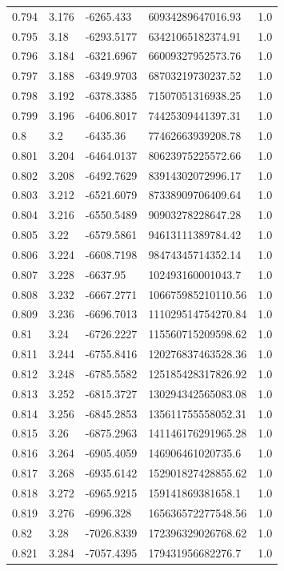 \begin{tabular}{lllll}
0.794 & 3.176 & -6265.433 & 60934289647016.93 & 1.0 \\
0.795 & 3.18 & -6293.5177 & 63421065182374.91 & 1.0 \\
0.796 & 3.184 & -6321.6967 & 66009327952573.76 & 1.0 \\
0.797 & 3.188 & -6349.9703 & 68703219730237.52 & 1.0 \\
0.798 & 3.192 & -6378.3385 & 71507051316938.25 & 1.0 \\
0.799 & 3.196 & -6406.8017 & 74425309441397.31 & 1.0 \\
0.8 & 3.2 & -6435.36 & 77462663939208.78 & 1.0 \\
0.801 & 3.204 & -6464.0137 & 80623975225572.66 & 1.0 \\
0.802 & 3.208 & -6492.7629 & 83914302072996.17 & 1.0 \\
0.803 & 3.212 & -6521.6079 & 87338909706409.64 & 1.0 \\
0.804 & 3.216 & -6550.5489 & 90903278228647.28 & 1.0 \\
0.805 & 3.22 & -6579.5861 & 94613111389784.42 & 1.0 \\
0.806 & 3.224 & -6608.7198 & 98474345714352.14 & 1.0 \\
0.807 & 3.228 & -6637.95 & 102493160001043.7 & 1.0 \\
0.808 & 3.232 & -6667.2771 & 106675985210110.56 & 1.0 \\
0.809 & 3.236 & -6696.7013 & 111029514754270.84 & 1.0 \\
0.81 & 3.24 & -6726.2227 & 115560715209598.62 & 1.0 \\
0.811 & 3.244 & -6755.8416 & 120276837463528.36 & 1.0 \\
0.812 & 3.248 & -6785.5582 & 125185428317826.92 & 1.0 \\
0.813 & 3.252 & -6815.3727 & 130294342565083.08 & 1.0 \\
0.814 & 3.256 & -6845.2853 & 135611755558052.31 & 1.0 \\
0.815 & 3.26 & -6875.2963 & 141146176291965.28 & 1.0 \\
0.816 & 3.264 & -6905.4059 & 146906461020735.6 & 1.0 \\
0.817 & 3.268 & -6935.6142 & 152901827428855.62 & 1.0 \\
0.818 & 3.272 & -6965.9215 & 159141869381658.1 & 1.0 \\
0.819 & 3.276 & -6996.328 & 165636572277548.56 & 1.0 \\
0.82 & 3.28 & -7026.8339 & 172396329026768.62 & 1.0 \\
0.821 & 3.284 & -7057.4395 & 179431956682276.7 & 1.0 \\

\end{tabular}
